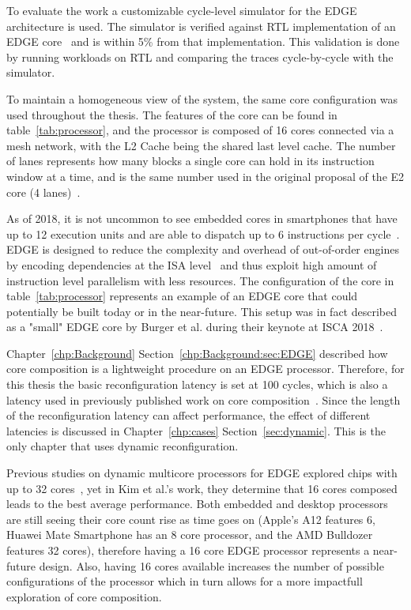 To evaluate the work a customizable cycle-level simulator for the EDGE architecture is used.
The simulator is verified against RTL implementation of an EDGE core~\cite{putnam2010e2,gray2018edge} and is within 5\% from that implementation.
This validation is done by running workloads on RTL and comparing the traces cycle-by-cycle with the simulator.

To maintain a homogeneous view of the system, the same core configuration was used throughout the thesis.
The features of the core can be found in table~\ref{tab:processor}, and the processor is composed of 16 cores connected via a mesh network, with the L2 Cache being the shared last level cache.
The number of lanes represents how many blocks a single core can hold in its instruction window at a time, and is the same number used in the original proposal of the E2 core (4 lanes)~\cite{putnam2010e2}.

As of 2018, it is not uncommon to see embedded cores in smartphones that have up to 12 execution units and are able to dispatch up to 6 instructions per cycle~\cite{samsung2018,apple}.
EDGE is designed to reduce the complexity and overhead of out-of-order engines by encoding dependencies at the ISA level~\cite{kim2007tflex,gray2018edge} and thus exploit high amount of instruction level parallelism with less resources.
The configuration of the core in table~\ref{tab:processor} represents an example of an EDGE core that could potentially be built today or in the near-future.
This setup was in fact described as a "small" EDGE core by Burger et al. during their keynote at ISCA 2018~\cite{iscakeynote,e2thereg,twitter}.

Chapter~\ref{chp:Background} Section~\ref{chp:Background:sec:EDGE} described how core composition is a lightweight procedure on an EDGE processor.
Therefore, for this thesis the basic reconfiguration latency is set at 100 cycles, which is also a latency used in previously published work on core composition~\cite{pricopi2012bahurupi}.
Since the length of the reconfiguration latency can affect performance, the effect of different latencies is discussed in Chapter~\ref{chp:cases} Section~\ref{sec:dynamic}.
This is the only chapter that uses dynamic reconfiguration.
 
Previous studies on dynamic multicore processors for EDGE explored chips with up to 32 cores~\cite{kim2007tflex, gulati2008multitaskingdmc}, yet in Kim et al.'s work, they determine that 16 cores composed leads to the best average performance.
Both embedded and desktop processors are still seeing their core count rise as time goes on (Apple's A12 features 6, Huawei Mate Smartphone has an 8 core processor, and the AMD Bulldozer features 32 cores), therefore having a 16 core EDGE processor represents a near-future design.
Also, having 16 cores available increases the number of possible configurations of the processor which in turn allows for a more impactfull exploration of core composition.

